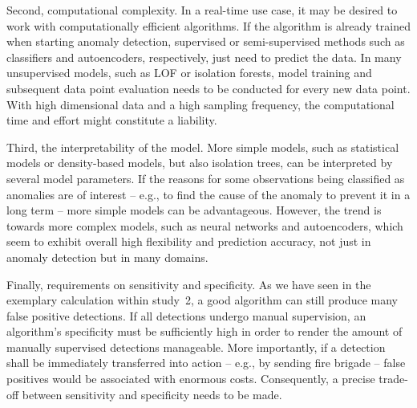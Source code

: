 \documentclass[conference]{IEEEtran}
\begin{document}
Second, computational complexity. In a real-time use case, it may be desired to work with computationally efficient algorithms. If the algorithm is already trained when starting anomaly detection, supervised or semi-supervised methods such as classifiers and autoencoders, respectively, just need to predict the data. In many unsupervised models, such as LOF or isolation forests, model training and subsequent data point evaluation needs to be conducted for every new data point. With high dimensional data and a high sampling frequency, the computational time and effort might constitute a liability.

Third, the interpretability of the model. More simple models, such as statistical models or density-based models, but also isolation trees, can be interpreted by several model parameters. If the reasons for some observations being classified as anomalies are of interest -- e.g., to find the cause of the anomaly to prevent it in a long term  -- more simple models can be advantageous. However, the trend is towards more complex models, such as neural networks and autoencoders, which seem to exhibit overall high flexibility and prediction accuracy, not just in anomaly detection but in many domains.

Finally, requirements on sensitivity and specificity. As we have seen in the exemplary calculation within study~2, a good algorithm can still produce many false positive detections. If all detections undergo manual supervision, an algorithm's specificity must be sufficiently high in order to render the amount of manually supervised detections manageable. More importantly, if a detection shall be immediately transferred into action -- e.g., by sending fire brigade -- false positives would be associated with enormous costs. Consequently, a precise trade-off between sensitivity and specificity needs to be made.
\end{document}
